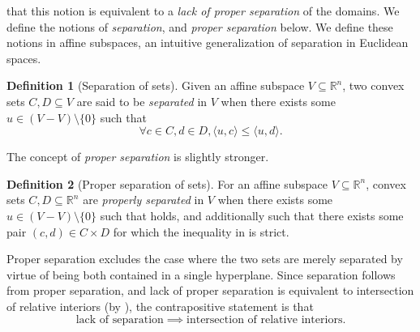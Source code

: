 \documentclass{article}
\theoremstyle{plain}
\theoremstyle{definition}
\newtheorem{definition}{Definition}[section]
\theoremstyle{remark}
\begin{document}
that this notion is equivalent to a \emph{lack of proper separation}
of the domains. We define the notions of \emph{separation}, and \emph{proper separation} below.
We define these notions in affine subspaces, an intuitive generalization
of separation in Euclidean spaces.
\begin{definition}[Separation of sets]
\label{loc:separation_of_sets.statement}
Given an affine subspace $V \subseteq \mathbb{R}^n$, two convex sets
$C, D \subseteq V$ are said to be \emph{separated} in $V$
when there exists some $u \in (V-V) \setminus \{0\}$ such that 
\begin{equation}
\label{eq:sep}
\forall c \in C,  d \in D, \langle u, c\rangle \le \langle u, d\rangle.
\end{equation}
\end{definition}
The concept of \emph{proper separation} is slightly stronger.
\begin{definition}[Proper separation of sets]
\label{loc:proper_separation_of_sets.statement}
For an affine subspace $V \subseteq \mathbb{R}^n$, convex sets $C,D \subseteq \mathbb{R}^n$
are \emph{properly separated} in $V$ when
there exists some $u \in (V-V) \setminus \{0\}$ such that  holds, and 
additionally such that there exists some pair $(c, d) \in C \times D$ for 
which the inequality in  is
strict.
\end{definition}
Proper separation excludes the case where the two sets are
merely separated by virtue of being both contained in a single hyperplane.
Since separation follows from proper separation, and lack of proper separation
is equivalent to intersection of relative interiors (by \cite[Theorem 11.3]{rockafellarConvexAnalysis1970}), the contrapositive
statement is that
\begin{equation}
\label{eq:relation_sep}
\text{lack of separation} \implies \text{intersection of relative interiors}.
\end{equation}
\end{document}

